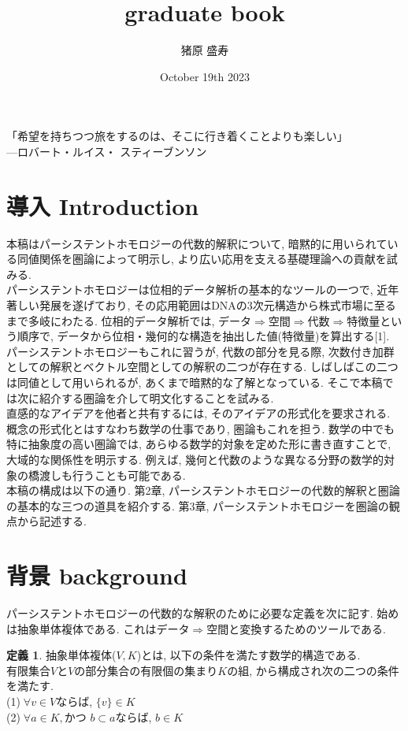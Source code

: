 \documentclass[a4paper]{jsarticle}
\title{graduate book}
\author{猪原 盛寿}
\date{October 19th 2023}
\theoremstyle{definition}
\newtheorem{dfn}{定義}[section]
\begin{document}
\Large
\maketitle
「希望を持ちつつ旅をするのは、そこに行き着くことよりも楽しい」\\
---ロバート・ルイス・ スティーブンソン
\section{導入 Introduction}
本稿はパーシステントホモロジーの代数的解釈について, 暗黙的に用いられている同値関係を圏論によって明示し, より広い応用を支える基礎理論への貢献を試みる. \\

パーシステントホモロジーは位相的データ解析の基本的なツールの一つで, 近年著しい発展を遂げており, その応用範囲はDNAの3次元構造から株式市場に至るまで多岐にわたる. 位相的データ解析では, データ$\Rightarrow$空間$\Rightarrow$代数$\Rightarrow$特徴量という順序で, データから位相・幾何的な構造を抽出した値(特徴量)を算出する[1]. パーシステントホモロジーもこれに習うが, 代数の部分を見る際, 次数付き加群としての解釈とベクトル空間としての解釈の二つが存在する. しばしばこの二つは同値として用いられるが, あくまで暗黙的な了解となっている. そこで本稿では次に紹介する圏論を介して明文化することを試みる. \\

直感的なアイデアを他者と共有するには, そのアイデアの形式化を要求される. 概念の形式化とはすなわち数学の仕事であり, 圏論もこれを担う. 数学の中でも特に抽象度の高い圏論では, あらゆる数学的対象を定めた形に書き直すことで, 大域的な関係性を明示する. 例えば, 幾何と代数のような異なる分野の数学的対象の橋渡しも行うことも可能である. \\

本稿の構成は以下の通り. 第2章, パーシステントホモロジーの代数的解釈と圏論の基本的な三つの道具を紹介する. 第3章, パーシステントホモロジーを圏論の観点から記述する. 
\section{背景 background}
パーシステントホモロジーの代数的な解釈のために必要な定義を次に記す. 始めは抽象単体複体である. これはデータ$\Rightarrow$空間と変換するためのツールである. 
\begin{dfn}
    抽象単体複体($V,K$)とは, 以下の条件を満たす数学的構造である.\\
    有限集合$V$と$V$の部分集合の有限個の集まり$K$の組, から構成され次の二つの条件を満たす.\\
    \noindent
    (1)$\; \forall v\in V$ならば, $\{v\}\in K$ \\
    (2)$\; \forall a\in K,$かつ $b\subset a$ならば, $b\in K$
\end{dfn}
\end{document}
